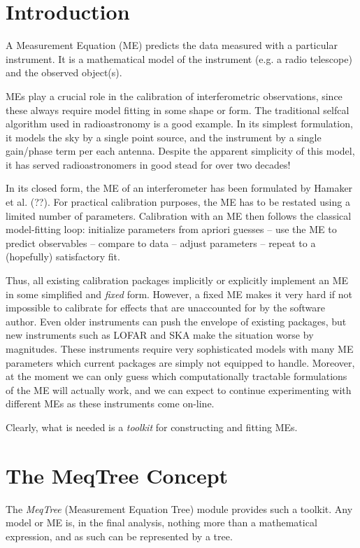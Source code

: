 \documentclass[11pt,twoside]{article}  %
\begin{document}
\section{Introduction}

A Measurement Equation (ME) predicts the data measured with a particular
instrument. It is a mathematical model of the instrument (e.g. a radio
telescope) and the observed object(s). 

MEs play a crucial role in the calibration of interferometric observations,
since these always require model fitting in some shape or form. The traditional
selfcal algorithm used in radioastronomy is a good example. In its simplest
formulation, it models the sky by a single point source, and the instrument by a
single gain/phase term per each antenna. Despite the apparent simplicity of this
model, it has served radioastronomers in good stead for over two decades!

In its closed form, the ME of an interferometer has been formulated by Hamaker
et al. (??). For practical calibration purposes, the ME has to be restated using
a limited number of parameters. Calibration with an ME then follows the
classical model-fitting loop: initialize parameters from apriori guesses -- use
the ME to predict observables -- compare to data -- adjust parameters -- repeat
to a (hopefully) satisfactory fit.

Thus, all existing calibration packages implicitly or explicitly implement an ME
in some simplified and {\em fixed} form. However, a fixed ME makes it very hard
if not impossible to calibrate for effects that are unaccounted for by the
software author. Even older instruments can push the envelope of existing
packages, but new instruments such as LOFAR and SKA make the situation worse by
magnitudes. These instruments require very sophisticated models with many ME
parameters which current packages are simply not equipped to handle. Moreover,
at the moment we can only guess which computationally tractable formulations of
the ME will actually work, and we can expect to continue experimenting with
different MEs as these instruments come on-line.

Clearly, what is needed is a {\em toolkit} for constructing and fitting MEs. 

\section{The MeqTree Concept}

The {\em MeqTree} (Measurement Equation Tree) module provides such a toolkit.
Any model or ME is, in the final analysis, nothing more than a mathematical
expression, and as such can be represented by a tree.
\end{document}
